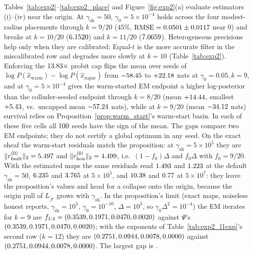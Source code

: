 \documentclass[11pt,a4paper]{article}
\theoremstyle{definition}
\theoremstyle{remark}
\begin{document}
Tables~\ref{tab:exp2}--\ref{tab:exp2_place} and Figure~\ref{fig:exp2}(a) evaluate estimators (i)--(iv) near the origin. At $\gamma_{\mathrm{sh}} = 50$, $\gamma_0 = 5\times 10^{-4}$ holds across the four modest-radius placements through $k = 9/20$ ($45\%$, $\mathrm{RMSE} = 0.0501 \pm 0.0117$ near $0$) and breaks at $k = 10/20$ ($6.1520$) and $k = 11/20$ ($7.0659$). Heterogeneous precisions help only when they are calibrated: Equal-$t$ is the more accurate filter in the miscalibrated row and degrades more slowly at $k = 10$ (Table~\ref{tab:exp2}). Enforcing the $13.83\times$ probit cap flips the mean over seeds of $\log P(\hat{x}_{\mathrm{warm}}) - \log P(\hat{x}_{\mathrm{rogue}})$ from $-58.45$ to $+22.18$ nats at $\gamma_0 = 0.05, k=9$, and at $\gamma_0 = 5\times 10^{-4}$ gives the warm-started EM endpoint a higher log-posterior than the colluder-seeded endpoint through $k = 8/20$ (mean $+14.44$, smallest $+5.43$, vs.\ uncapped mean $-57.24$ nats), while at $k = 9/20$ (mean $-34.12$ nats) survival relies on Proposition~\ref{prop:warm_start}'s warm-start basin. In each of these five cells all $100$ seeds have the sign of the mean. The gaps compare two EM endpoints; they do not certify a global optimum in any seed. On the exact sheaf the warm-start residuals match the proposition: at $\gamma_{\mathrm{sh}} = 5\times 10^5$ they are $\|r_{\mathrm{fault}}^{(0)}\|_2 = 5.497$ and $\|r_{\mathrm{hon}}^{(0)}\|_2 = 4.499$, i.e.\ $(1-f_0)\Delta$ and $f_0\Delta$ with $f_0 = 9/20$. With the estimated maps the same residuals read $1.493$ and $1.223$ at the default $\gamma_{\mathrm{sh}} = 50$, $6.235$ and $3.765$ at $5\times 10^5$, and $10.38$ and $0.77$ at $5\times 10^7$: they leave the proposition's values and head for a collapse onto the origin, because the origin pull of $L_{\widetilde{\mathcal{F}}}$ grows with $\gamma_{\mathrm{sh}}$. In the proposition's limit (exact maps, noiseless honest reports, $\gamma_{\mathrm{sh}} = 10^5$, $\gamma_0 = 10^{-10}$, $\Delta = 10^3$, so $\gamma_0\Delta^2 = 10^{-4}$) the EM iterates for $k=9$ are $f_{1:4} = (0.3539, 0.1971, 0.0470, 0.0020)$ against $\Psi$'s $(0.3539, 0.1971, 0.0470, 0.0020)$; with the exponents of Table~\ref{tab:exp2_l1exp}'s second row ($k=12$) they are $(0.2751, 0.0944, 0.0078, 0.0000)$ against $(0.2751, 0.0944, 0.0078, 0.0000)$. The largest gap is \resPropFourMapGap.
\end{document}
